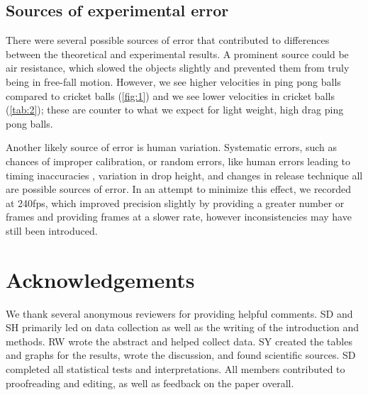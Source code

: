 \documentclass[reprint,amsmath,amssymb,aps,twoside]{revtex4-2}
\begin{document}

\subsection{Sources of experimental error}
There were several possible sources of error that contributed to differences between the theoretical and experimental results. A prominent source could be air resistance, which slowed the objects slightly and prevented them from truly being in free-fall motion. However, we see higher velocities in ping pong balls compared to cricket balls (\cref{fig:1}) and we see lower velocities in cricket balls (\cref{tab:2}); these are counter to what we expect for light weight, high drag ping pong balls.

Another likely source of error is human variation. Systematic errors, such as chances of improper calibration, or random errors, like human errors leading to timing inaccuracies \cite{hetzler:2008:reliability,faux:2019:manual}, variation in drop height, and changes in release technique all are possible sources of error. In an attempt to minimize this effect, we recorded at 240fps, which improved precision slightly by providing a greater number or frames and providing frames at a slower rate, however inconsistencies may have still been introduced.





\section{Acknowledgements} 
We thank several anonymous reviewers for providing helpful comments. SD and SH primarily led on data collection as well as the writing of the introduction and methods. RW wrote the abstract and helped collect data. SY created the tables and graphs for the results, wrote the discussion, and found scientific sources. SD completed all statistical tests and interpretations. All members contributed to proofreading and editing, as well as feedback on the paper overall. 
\end{document}
